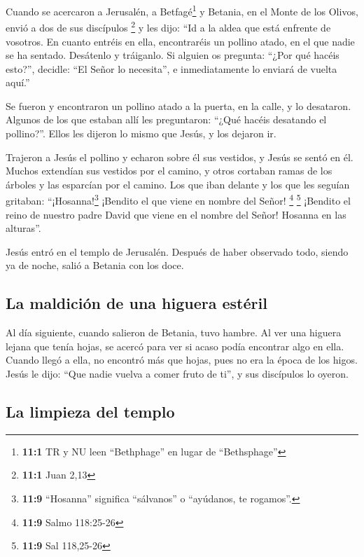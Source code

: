  Cuando se acercaron a Jerusalén, a Betfagé\footnote{\textbf{11:1}
  TR y NU leen ``Bethphage'' en lugar de ``Bethsphage''} y Betania, en
el Monte de los Olivos, envió a dos de sus discípulos \footnote{\textbf{11:1}
  Juan 2,13}  y les dijo: ``Id a la aldea que está
enfrente de vosotros. En cuanto entréis en ella, encontraréis un pollino
atado, en el que nadie se ha sentado. Desátenlo y tráiganlo.
 Si alguien os pregunta: ``¿Por qué hacéis esto?'',
decidle: ``El Señor lo necesita'', e inmediatamente lo enviará de vuelta
aquí.''

 Se fueron y encontraron un pollino atado a la puerta, en
la calle, y lo desataron.  Algunos de los que estaban allí
les preguntaron: ``¿Qué hacéis desatando el pollino?''. 
Ellos les dijeron lo mismo que Jesús, y los dejaron ir.

 Trajeron a Jesús el pollino y echaron sobre él sus
vestidos, y Jesús se sentó en él.  Muchos extendían sus
vestidos por el camino, y otros cortaban ramas de los árboles y las
esparcían por el camino.  Los que iban delante y los que
les seguían gritaban: ``¡Hosanna!\footnote{\textbf{11:9} ``Hosanna''
  significa ``sálvanos'' o ``ayúdanos, te rogamos''.} ¡Bendito el que
viene en nombre del Señor! \footnote{\textbf{11:9} Salmo 118:25-26}
\footnote{\textbf{11:9} Sal 118,25-26}  ¡Bendito el reino
de nuestro padre David que viene en el nombre del Señor! Hosanna en las
alturas''.

 Jesús entró en el templo de Jerusalén. Después de haber
observado todo, siendo ya de noche, salió a Betania con los doce.

\hypertarget{la-maldiciuxf3n-de-una-higuera-estuxe9ril}{%
\subsection{La maldición de una higuera
estéril}\label{la-maldiciuxf3n-de-una-higuera-estuxe9ril}}

 Al día siguiente, cuando salieron de Betania, tuvo
hambre.  Al ver una higuera lejana que tenía hojas, se
acercó para ver si acaso podía encontrar algo en ella. Cuando llegó a
ella, no encontró más que hojas, pues no era la época de los higos.
 Jesús le dijo: ``Que nadie vuelva a comer fruto de ti'',
y sus discípulos lo oyeron.

\hypertarget{la-limpieza-del-templo}{%
\subsection{La limpieza del templo}\label{la-limpieza-del-templo}}

